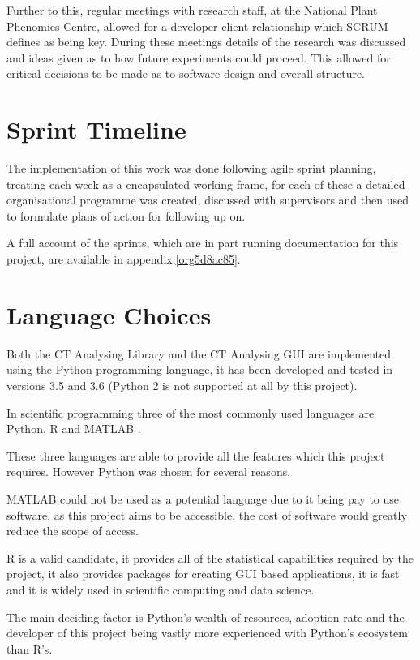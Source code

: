 \documentclass[11pt]{report}
\begin{document}
Further to this, regular meetings with research staff, at the National Plant Phenomics Centre,  allowed for a developer-client relationship which SCRUM defines as being key. During these meetings details of the research was discussed and ideas given as to how future experiments could proceed. This allowed for critical decisions to be made as to software design and overall structure.
\section{Sprint Timeline}
\label{sec:org946e0f8}
The implementation of this work was done following agile sprint planning, treating each week as a encapsulated working frame, for each of these a detailed organisational programme was created, discussed with supervisors and then used to formulate plans of action for following up on.

A full account of the sprints, which are in part running documentation for this project, are available in appendix:\ref{org5d8ac85}.

\section{Language Choices}
\label{sec:orgc864c6c}
Both the CT Analysing Library and the CT Analysing GUI are implemented using the Python programming language, it has been developed and tested in versions 3.5 and 3.6 (Python 2 is not supported at all by this project).

In scientific programming three of the most commonly used languages are Python, R and MATLAB \cite{Ozgur2016}.

These three languages are able to provide all the features which this project requires. However Python was chosen for several reasons.

MATLAB could not be used as a potential language due to it being pay to use software, as this project aims to be accessible, the cost of software would greatly reduce the scope of access.

R is a valid candidate, it provides all of the statistical capabilities required by the project, it also provides packages for creating GUI based applications, it is fast and it is widely used in scientific computing and data science.

The main deciding factor is Python's wealth of resources, adoption rate and the developer of this project being vastly more experienced with Python's ecosystem than R's.
\end{document}
